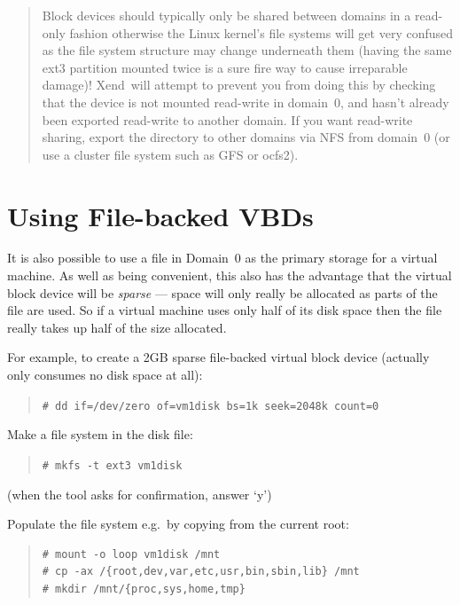 \documentclass[11pt,twoside,final,openright]{report}
\def\Xend{{Xend}\xspace}
\begin{document}
\begin{center}
\end{center}
\begin{quote}
  Block devices should typically only be shared between domains in a
  read-only fashion otherwise the Linux kernel's file systems will get
  very confused as the file system structure may change underneath
  them (having the same ext3 partition mounted  twice is a
  sure fire way to cause irreparable damage)!  \Xend\ will attempt to
  prevent you from doing this by checking that the device is not
  mounted read-write in domain~0, and hasn't already been exported
  read-write to another domain.  If you want read-write sharing,
  export the directory to other domains via NFS from domain~0 (or use
  a cluster file system such as GFS or ocfs2).
\end{quote}


\section{Using File-backed VBDs}

It is also possible to use a file in Domain~0 as the primary storage
for a virtual machine.  As well as being convenient, this also has the
advantage that the virtual block device will be \emph{sparse} ---
space will only really be allocated as parts of the file are used.  So
if a virtual machine uses only half of its disk space then the file
really takes up half of the size allocated.

For example, to create a 2GB sparse file-backed virtual block device
(actually only consumes no disk space at all):
\begin{quote}
  \verb_# dd if=/dev/zero of=vm1disk bs=1k seek=2048k count=0_
\end{quote}

Make a file system in the disk file:
\begin{quote}
  \verb_# mkfs -t ext3 vm1disk_
\end{quote}

(when the tool asks for confirmation, answer `y')

Populate the file system e.g.\ by copying from the current root:
\begin{quote}
\begin{verbatim}
# mount -o loop vm1disk /mnt
# cp -ax /{root,dev,var,etc,usr,bin,sbin,lib} /mnt
# mkdir /mnt/{proc,sys,home,tmp}
\end{verbatim}
\end{quote}
\end{document}
